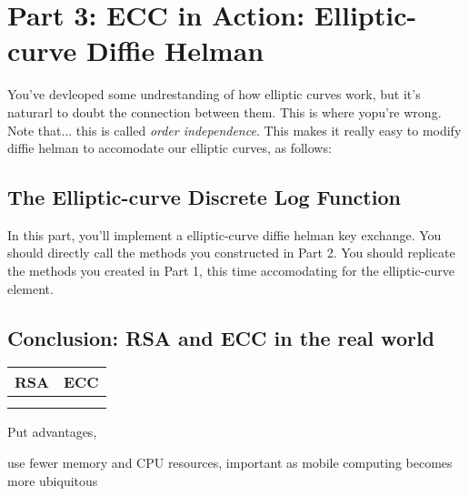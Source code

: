 \documentclass{article}
\begin{document}
\section*{Part 3: ECC in Action: Elliptic-curve Diffie Helman}

You've devleoped some undrestanding of how elliptic curves work, but it's naturarl to doubt the connection between them. This is where yopu're wrong. Note that... this is called \textit{order independence}. This makes it really easy to modify diffie helman to accomodate our elliptic curves, as follows:


\subsection*{The Elliptic-curve Discrete Log Function}

\begin{tcolorbox}
    In this part, you'll implement a elliptic-curve diffie helman key exchange. You should directly call the methods you constructed in Part 2. You should replicate the methods you created in Part 1, this time accomodating for the elliptic-curve element.
\end{tcolorbox}



\subsection*{Conclusion: RSA and ECC in the real world}


\begin{center}
    \begin{tabular}{c|c}
        RSA & ECC \\
        \hline \\
         & 
    \end{tabular}
\end{center}

Put advantages, 

use fewer memory and CPU resources, important as mobile computing becomes more ubiquitous
\end{document}

